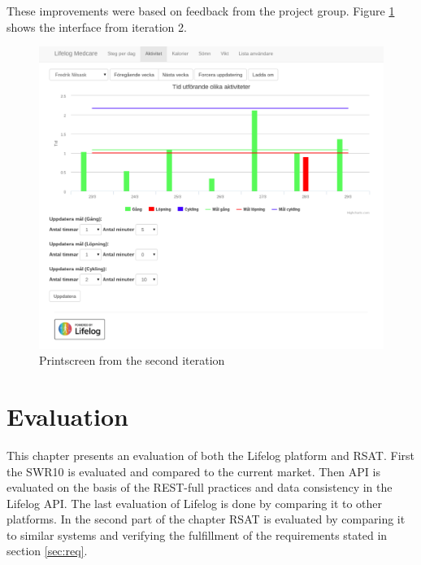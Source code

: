\documentclass{cslthse-msc}
\begin{document}
These improvements were based on feedback from the project group. Figure \ref{fig:second-screen} shows the interface from iteration 2.





\begin{figure}[!hbt]
\centering
\includegraphics[scale=0.4]{seceenshot-second-version.pdf} 
\caption{Printscreen from the second iteration}\label{fig:second-screen}
\end{figure}

\chapter{Evaluation}

 This chapter presents an evaluation of both the Lifelog platform and RSAT. First the SWR10 is evaluated and compared to the current market. Then API is evaluated on the basis of the REST-full practices and data consistency in the Lifelog API. The last evaluation of Lifelog is done by comparing it to other platforms. In the second part of the chapter RSAT is evaluated by comparing it to similar systems and verifying the fulfillment of the requirements stated in section \ref{sec:req}.
\end{document}
